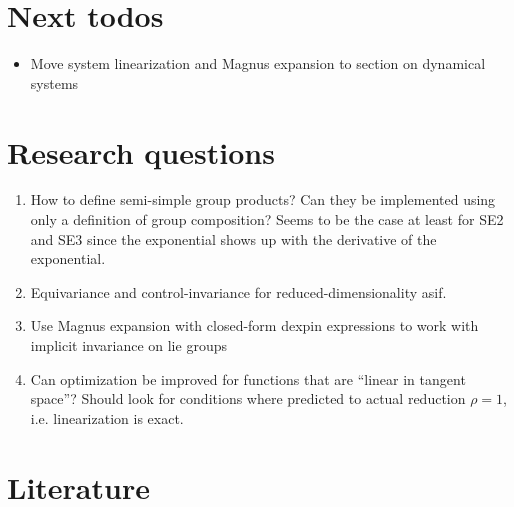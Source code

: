 

\section{Next todos}

\begin{itemize}
  \item Move system linearization and Magnus expansion to section on dynamical systems
\end{itemize}

\section{Research questions}

\begin{enumerate}
  \item How to define semi-simple group products? Can they be implemented using only a definition of group composition? Seems to be the case at least for SE2 and SE3 since the exponential shows up with the derivative of the exponential.
  \item Equivariance and control-invariance for reduced-dimensionality asif.
  \item Use Magnus expansion with closed-form dexpin expressions to work with implicit invariance on lie groups
  \item Can optimization be improved for functions that are ``linear in tangent space''? Should look for conditions where predicted to actual reduction $\rho = 1$, i.e. linearization is exact.
\end{enumerate}


\section{Literature}

